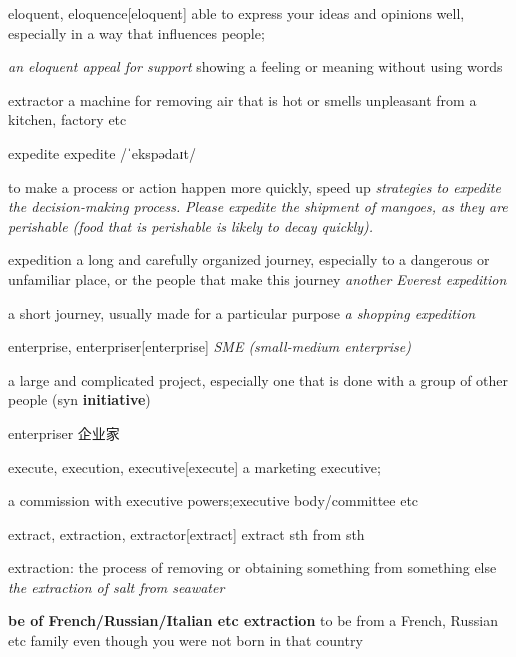 \begin{DefWord}{eloquent, eloquence}[eloquent]
    able to express your ideas and opinions well, especially in a way that influences people;

\textit{an eloquent appeal for support}
showing a feeling or meaning without using words
\end{DefWord}

\begin{DefWord}{extractor}
    a machine for removing air that is hot or smells unpleasant from a kitchen, factory etc
\end{DefWord}

\begin{DefWord}{expedite}
    expedite /ˈekspədaɪt/

    to make a process or action happen more quickly, speed up
    \textit{strategies to expedite the decision-making process.}
    \textit{Please expedite the shipment of mangoes, as they are perishable (food that is perishable is likely to decay quickly).}
\end{DefWord}

\begin{DefWord}{expedition}
    a long and carefully organized journey, especially to a dangerous or unfamiliar place, or the people that make this journey
    \textit{another Everest expedition}

    a short journey, usually made for a particular purpose
    \textit{a shopping expedition}
\end{DefWord}

\begin{DefWord}{enterprise, enterpriser}[enterprise]
    \textit{SME (small-medium enterprise)}
    
    a large and complicated project, especially one that is done with a group of other people (syn \textbf{initiative})

    enterpriser 企业家
\end{DefWord}

\begin{DefWord}{execute, execution, executive}[execute]
    a marketing executive; 
    
    a commission with executive powers;executive body/committee etc
\end{DefWord}

\begin{DefWord}{extract, extraction, extractor}[extract]
    extract sth from sth

    extraction: the process of removing or obtaining something from something else
    \textit{the extraction of salt from seawater}

    \textbf{be of French/Russian/Italian etc extraction} to be from a French, Russian etc family even though you were not born in that country
\end{DefWord}

